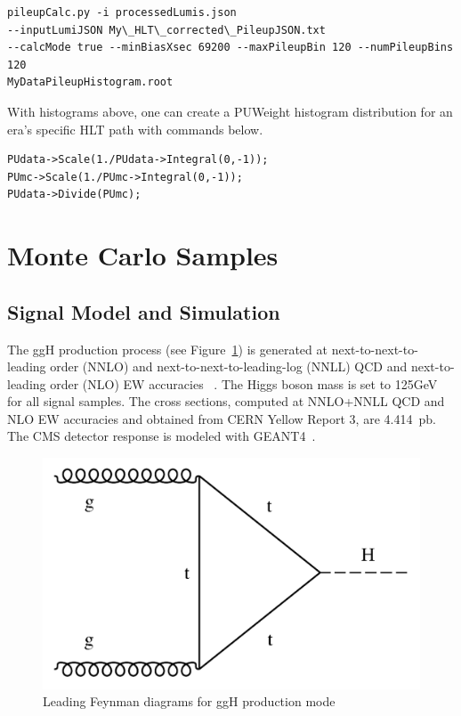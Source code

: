 \begin{verbatim}
pileupCalc.py -i processedLumis.json 
--inputLumiJSON My\_HLT\_corrected\_PileupJSON.txt  
--calcMode true --minBiasXsec 69200 --maxPileupBin 120 --numPileupBins 120 
MyDataPileupHistogram.root
\end{verbatim}

With histograms above, one can create a PUWeight histogram distribution for an era's specific HLT path with commands below.
\begin{verbatim}
PUdata->Scale(1./PUdata->Integral(0,-1));
PUmc->Scale(1./PUmc->Integral(0,-1));
PUdata->Divide(PUmc);
\end{verbatim}

\section{Monte Carlo Samples}

\subsection{Signal Model and Simulation}

The ggH production process (see Figure~\ref{fig:feynmanggH}) is generated at next-to-next-to-leading order (NNLO) and next-to-next-to-leading-log (NNLL) QCD and next-to-leading order (NLO) EW accuracies ~\cite{Heinemeyer:2013xd}.
The Higgs boson mass is set to 125GeV for all signal samples.
The cross sections, computed at NNLO+NNLL QCD and NLO EW accuracies and obtained from CERN Yellow Report 3,
are 4.414~$\mathrm{pb}$. The CMS detector response is modeled with GEANT4~\cite{Agostinelli:2002hh}.

\begin{figure}[h!]
  \caption{Leading Feynman diagrams for ggH production mode}
  \label{fig:feynmanggH}
  \centering
  \includegraphics[width=0.47\linewidth]{figs/feynmanggH.pdf}

\end{figure}



